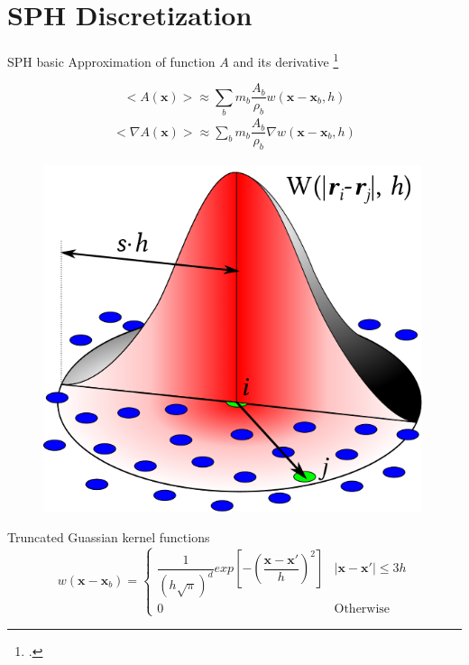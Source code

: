 \documentclass{beamer}
\begin{document}
\section{SPH Discretization}
\begin{frame}{SPH basic}
Approximation of function $A$ and its derivative \footcite{monaghan2005smoothed}
\begin{minipage}{0.63 \textwidth}
\begin{equation}
<A\left(\textbf{x}\right)> \approx \sum_b m_b \dfrac{A_b}{\rho_b} w\left(\textbf{x}-\textbf{x}_b, h\right)
\label{eq:SPH-approximation-sum}
\end{equation}
\begin{equation}
\begin{split}
<\nabla A\left(\textbf{x}\right)> \approx \sum_b m_b \dfrac{A_b}{\rho_b} \nabla w\left(\textbf{x} - \textbf{x}_b, h\right)
\end{split} 
\label{eq:SPH-scalar-function-gradient}
\end{equation}
\end{minipage}
\begin{minipage}{0.36 \textwidth}
\begin{figure}
\center
\includegraphics[width=0.99\textwidth]{./PPT/SPH-interpolation}
\end{figure}
\end{minipage}

Truncated Guassian kernel functions
\begin{equation}
w\left(\textbf{x} - \textbf{x}_b\right) = 
\begin{cases} 
      \dfrac{1}{\left(h \sqrt{\pi}\right)^d} exp \left[- \left(\dfrac{\textbf{x} - \textbf{x} \prime}{h} \right)^2 \right] &  \vert \textbf{x} - \textbf{x} \prime \vert \leq 3h\\
      0 & \text{Otherwise}
\end{cases}
\label{eq:SPH-kernel}
\end{equation}
\end{frame}
\end{document}
